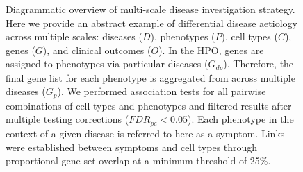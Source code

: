 \documentclass[
]{agujournal2019}
\begin{document}
\begin{figure}


\caption{\label{fig-diagram}Diagrammatic overview of multi-scale disease
investigation strategy. Here we provide an abstract example of
differential disease aetiology across multiple scales: diseases (\(D\)),
phenotypes (\(P\)), cell types (\(C\)), genes (\(G\)), and clinical
outcomes (\(O\)). In the HPO, genes are assigned to phenotypes via
particular diseases (\(G_{dp}\)). Therefore, the final gene list for
each phenotype is aggregated from across multiple diseases (\(G_{p}\)).
We performed association tests for all pairwise combinations of cell
types and phenotypes and filtered results after multiple testing
corrections (\(FDR_{pc}<0.05\)). Each phenotype in the context of a
given disease is referred to here as a symptom. Links were established
between symptoms and cell types through proportional gene set overlap at
a minimum threshold of 25\%.}

\end{figure}%

\newpage{}
\end{document}
